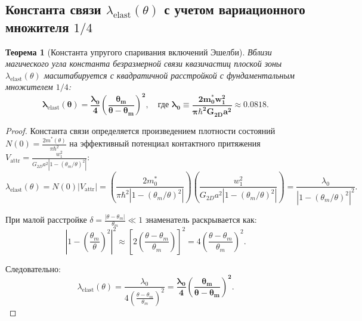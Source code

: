 \documentclass[12pt,a4paper]{article}
\newtheorem{theorem}{Теорема}
\begin{document}
\subsection{Константа связи $\lambda_{\text{elast}}(\theta)$ с учетом вариационного множителя $1/4$}
\begin{theorem}[Константа упругого спаривания включений Эшелби]
	Вблизи магического угла константа безразмерной связи квазичастиц плоской зоны $\lambda_{\mathrm{elast}}(\theta)$ масштабируется с квадратичной расстройкой с фундаментальным множителем $1/4$:
	\begin{equation}
		\mathbf{\lambda_{\mathrm{elast}}(\theta) = \frac{\lambda_0}{4} \left( \frac{\theta_m}{\theta - \theta_m} \right)^2}, \quad \text{где } \mathbf{\lambda_0 \equiv \frac{2 m_0^* w_1^2}{\pi \hbar^2 G_{2D} a^2} \approx 0.0818}.
	\end{equation}
\end{theorem}

\begin{proof}
	Константа связи определяется произведением плотности состояний $N(0) = \frac{2 m^*(\theta)}{\pi \hbar^2}$ на эффективный потенциал контактного притяжения $V_{\text{attr}} = \frac{w_1^2}{G_{2D} a^2 |1 - (\theta_m/\theta)^2|}$:
	\begin{equation}
		\lambda_{\text{elast}}(\theta) = N(0) |V_{\text{attr}}| = \left( \frac{2 m_0^*}{\pi \hbar^2 \left| 1 - (\theta_m/\theta)^2 \right|} \right) \left( \frac{w_1^2}{G_{2D} a^2 \left| 1 - (\theta_m/\theta)^2 \right|} \right) = \frac{\lambda_0}{\left| 1 - (\theta_m/\theta)^2 \right|^2}.
	\end{equation}
	
	При малой расстройке $\delta = \frac{|\theta - \theta_m|}{\theta_m} \ll 1$ знаменатель раскрывается как:
	\begin{equation}
		\left| 1 - \left(\frac{\theta_m}{\theta}\right)^2 \right|^2 \approx \left[ 2 \left(\frac{\theta - \theta_m}{\theta_m}\right) \right]^2 = 4 \left(\frac{\theta - \theta_m}{\theta_m}\right)^2.
	\end{equation}
	
	Следовательно:
	\begin{equation}
		\lambda_{\text{elast}}(\theta) = \frac{\lambda_0}{4 \left( \frac{\theta - \theta_m}{\theta_m} \right)^2} = \mathbf{\frac{\lambda_0}{4} \left( \frac{\theta_m}{\theta - \theta_m} \right)^2}.
	\end{equation}
\end{proof}
\end{document}
